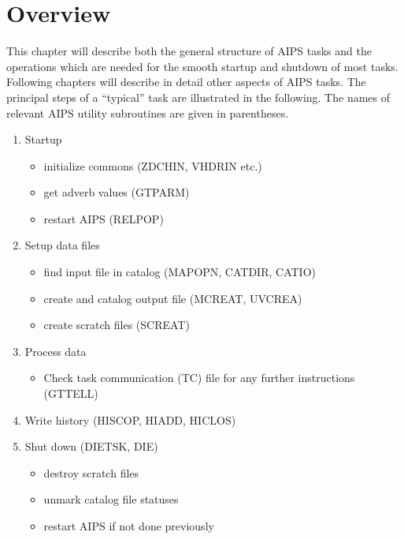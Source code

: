 \section{Overview}
This chapter will describe both the general structure of AIPS tasks
and the operations which are needed for the smooth startup and
shutdown of most tasks.  Following chapters will describe in detail
other aspects of AIPS tasks. The principal steps of a ``typical'' task
are illustrated in the following.  The names of relevant AIPS utility
subroutines are given in parentheses.
\begin{enumerate} %
\item Startup
\begin{itemize} %
\item {}
initialize commons (ZDCHIN, VHDRIN etc.)
\item get adverb values (GTPARM)
\item restart AIPS (RELPOP)
\end{itemize} %
\item Setup data files
\begin{itemize} %
\item find input file in catalog (MAPOPN, CATDIR, CATIO)
\item create and catalog output file (MCREAT, UVCREA)
\item create scratch files (SCREAT)
\end{itemize} %
\item Process data
\begin{itemize} %
\item {}
Check task communication (TC) file for any further instructions
(GTTELL)
\end{itemize} %
\item Write history (HISCOP, HIADD, HICLOS)
\item Shut down (DIETSK, DIE)
\begin{itemize} %
\item destroy scratch files
\item unmark catalog file statuses
\item restart AIPS if not done previously
\end{itemize} %
\end{enumerate} %

